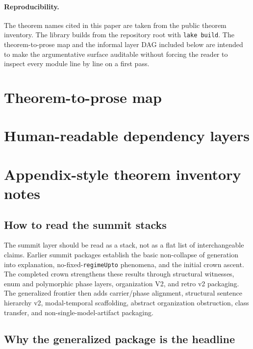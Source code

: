 \documentclass[11pt,a4paper]{article}
\theoremstyle{definition}
\begin{document}
\paragraph{Reproducibility.}
The theorem names cited in this paper are taken from the public theorem inventory. The library builds from the repository root with \texttt{lake build}. The theorem-to-prose map and the informal layer DAG included below are intended to make the argumentative surface auditable without forcing the reader to inspect every module line by line on a first pass.

\appendix

\section{Theorem-to-prose map}\label{sec:appendix-map}


\section{Human-readable dependency layers}\label{sec:appendix-dag}


\section{Appendix-style theorem inventory notes}\label{sec:appendix-inventory}

\subsection{How to read the summit stacks}

The summit layer should be read as a stack, not as a flat list of interchangeable claims. Earlier summit packages establish the basic non-collapse of generation into explanation, no-fixed-\texttt{regimeUpto} phenomena, and the initial crown ascent. The completed crown strengthens these results through structural witnesses, enum and polymorphic phase layers, organization V2, and retro v2 packaging. The generalized frontier then adds carrier/phase alignment, structural sentence hierarchy v2, modal-temporal scaffolding, abstract organization obstruction, class transfer, and non-single-model-artifact packaging.

\subsection{Why the generalized package is the headline}
\end{document}
